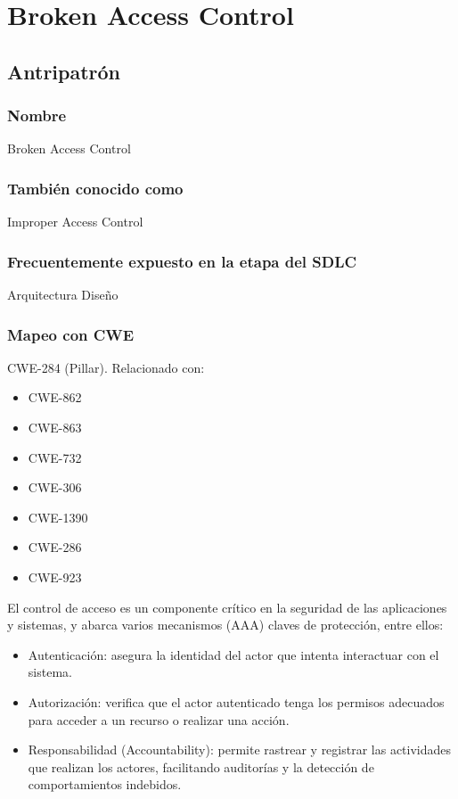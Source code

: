 
\chapter{Broken Access Control}

\section{Antripatrón}

\subsection*{Nombre}
Broken Access Control
\subsection*{También conocido como}
Improper Access Control
\subsection*{Frecuentemente expuesto en la etapa del SDLC}
Arquitectura 
Diseño
\subsection*{Mapeo con CWE}
CWE-284 (Pillar). Relacionado con:
\begin{itemize}
    \item CWE-862
    \item CWE-863
    \item CWE-732
    \item CWE-306
    \item CWE-1390
    \item CWE-286
    \item CWE-923
\end{itemize}
El control de acceso es un componente crítico en la seguridad de las aplicaciones y sistemas, y abarca varios mecanismos (AAA) claves de protección, entre ellos:

    \begin{itemize}
        \item Autenticación: asegura la identidad del actor que intenta interactuar con el sistema.
        \item Autorización: verifica que el actor autenticado tenga los permisos adecuados para acceder a un recurso o realizar una acción.
        \item Responsabilidad (Accountability): permite rastrear y registrar las actividades que realizan los actores, facilitando auditorías y la detección de comportamientos indebidos.
    \end{itemize}

